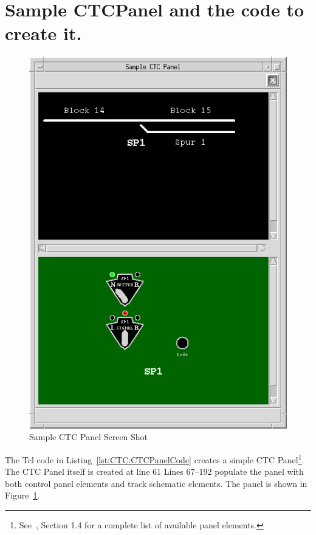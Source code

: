 \section{Sample CTCPanel and the code to create it.}


\begin{figure}[hbpt]
\begin{centering}
\includegraphics{CTCPanel.png}
\caption{Sample CTC Panel Screen Shot}
\label{fig:CTC:CTCPanelWindow}
\end{centering}
\end{figure}
The Tcl  code in Listing~\ref{lst:CTC:CTCPanelCode} creates a simple
CTC Panel\footnote{See~\cite{tclinternals}, Section 1.4 for a complete
list of available panel elements.}. The CTC Panel itself is created at
line 61 Lines 67--192 populate the panel with both control panel
elements and track schematic elements.  The panel is shown in
Figure~\ref{fig:CTC:CTCPanelWindow}.  

